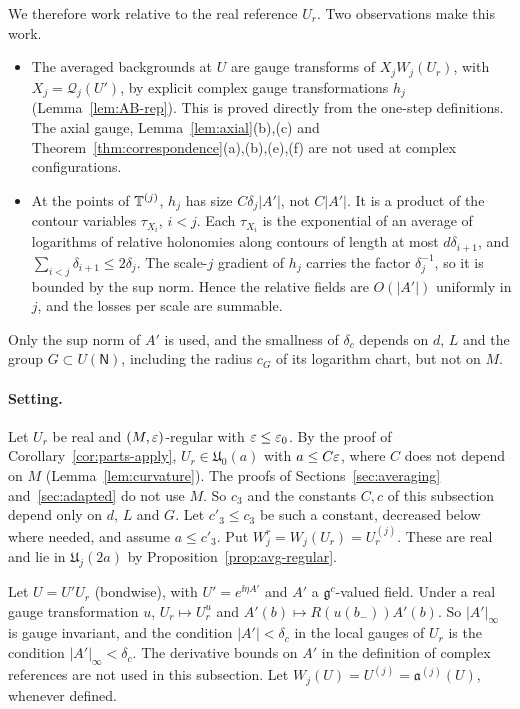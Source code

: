 We therefore work relative to the real reference $U_r$. Two observations make this work.
\begin{itemize}
\item The averaged backgrounds at $U$ are gauge transforms of $X_jW_j(U_r)$, with $X_j=\mathcal Q_j(U')$, by explicit complex gauge transformations $h_j$ (Lemma~\ref{lem:AB-rep}). This is proved directly from the one-step definitions. The axial gauge, Lemma~\ref{lem:axial}(b),(c) and Theorem~\ref{thm:correspondence}(a),(b),(e),(f) are not used at complex configurations.
\item At the points of $\mathbb T^{(j)}$, $h_j$ has size $C\delta_j|A'|$, not $C|A'|$. It is a product of the contour variables $\tau_{X_i}$, $i<j$. Each $\tau_{X_i}$ is the exponential of an average of logarithms of relative holonomies along contours of length at most $d\delta_{i+1}$, and $\sum_{i<j}\delta_{i+1}\le2\delta_j$. The scale-$j$ gradient of $h_j$ carries the factor $\delta_j^{-1}$, so it is bounded by the sup norm. Hence the relative fields are $O(|A'|)$ uniformly in $j$, and the losses per scale are summable.
\end{itemize}
Only the sup norm of $A'$ is used, and the smallness of $\delta_c$ depends on $d$, $L$ and the group $G\subset U(\mathsf N)$, including the radius $c_G$ of its logarithm chart, but not on $M$.

\paragraph{Setting.} Let $U_r$ be real and $(M,\varepsilon)$-regular with $\varepsilon\le\varepsilon_0$. By the proof of Corollary~\ref{cor:parts-apply}, $U_r\in\mathfrak U_0(a)$ with $a\le C\varepsilon$, where $C$ does not depend on $M$ (Lemma~\ref{lem:curvature}). The proofs of Sections~\ref{sec:averaging} and~\ref{sec:adapted} do not use $M$. So $c_3$ and the constants $C,c$ of this subsection depend only on $d$, $L$ and $G$. Let $c'_3\le c_3$ be such a constant, decreased below where needed, and assume $a\le c'_3$. Put $W^r_j=W_j(U_r)=U_r^{(j)}$. These are real and lie in $\mathfrak U_j(2a)$ by Proposition~\ref{prop:avg-regular}.

Let $U=U'U_r$ (bondwise), with $U'=e^{\ii\eta A'}$ and $A'$ a $\mathfrak g^c$-valued field. Under a real gauge transformation $u$, $U_r\mapsto U_r^u$ and $A'(b)\mapsto R(u(b_-))A'(b)$. So $|A'|_\infty$ is gauge invariant, and the condition $|A'|<\delta_c$ in the local gauges of $U_r$ is the condition $|A'|_\infty<\delta_c$. The derivative bounds on $A'$ in the definition of complex references are not used in this subsection. Let $W_j(U)=U^{(j)}=\mathfrak a^{(j)}(U)$, whenever defined.


